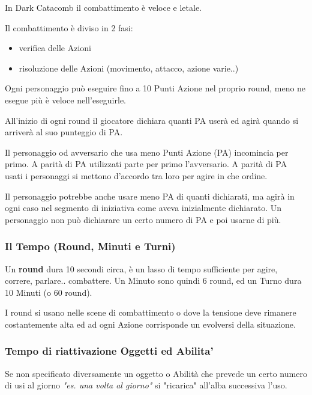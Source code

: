 \documentclass[12pt,a4paper,twoside,openany]{book}
\begin{document}
\begin{multicols}{2}
	


In Dark Catacomb il combattimento è veloce e letale.

\bigskip

Il combattimento è diviso in 2 fasi:
\begin{itemize}
	\item verifica delle Azioni
	\item risoluzione delle Azioni (movimento, attacco, azione varie..)
\end{itemize}

Ogni personaggio può eseguire fino a 10 Punti Azione nel proprio round, meno ne esegue più è veloce nell'eseguirle.

All'inizio di ogni round il giocatore dichiara quanti PA userà ed agirà quando si arriverà al suo punteggio di PA.

Il personaggio od avversario che usa meno Punti Azione (PA) incomincia per primo. A parità di PA utilizzati parte per primo l'avversario.
A parità di PA usati i personaggi si mettono d'accordo tra loro per agire in che ordine.

Il personaggio potrebbe anche usare meno PA di quanti dichiarati, ma agirà in ogni caso nel segmento di iniziativa come aveva inizialmente dichiarato.
Un personaggio non può dichiarare un certo numero di PA e poi usarne di più.


\subsubsection{Il Tempo (Round, Minuti e Turni)}\label{iltempo}

Un \textbf{round} dura 10 secondi circa, è un lasso di tempo sufficiente per agire, correre, parlare.. combattere. Un Minuto sono quindi 6 round, ed un Turno dura 10 Minuti (o 60 round).

I round si usano nelle scene di combattimento o dove la tensione deve rimanere costantemente alta ed ad ogni Azione corrisponde un evolversi della situazione.

\subsubsection{Tempo di riattivazione Oggetti ed Abilita'}\label{temporiattivazioneoggetti}

Se non specificato diversamente un oggetto o Abilità che prevede un certo numero di usi al giorno \textit{"es. una volta al giorno"} si "ricarica" all'alba successiva l'uso.


\end{multicols}
\end{document}
